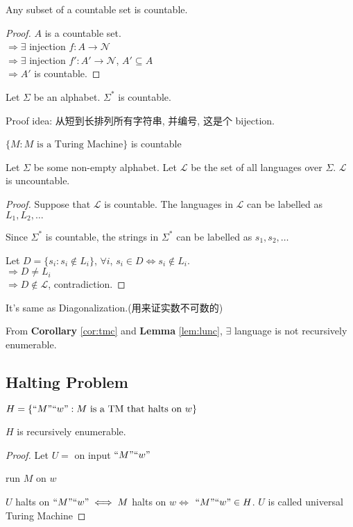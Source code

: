 \begin{corollary}
    Any subset of a countable set is countable. 
\end{corollary}
\begin{proof}
    $A$ is a countable set. \\
    $\Rightarrow \exists$ injection $f:A\to \mathcal{N}$\\
    $\Rightarrow \exists$ injection $f':A' \to \mathcal{N}$, $A'\subseteq A$\\
    $\Rightarrow A'$ is countable. 
\end{proof}

\begin{lemma}
    Let $\Sigma$ be an alphabet. $\Sigma^*$ is countable. 
\end{lemma}
Proof idea: 从短到长排列所有字符串, 并编号, 这是个 bijection. 

\begin{corollary}\label{cor:tmc}
    $\{ M: M \text{ is a Turing Machine} \}$ is countable
\end{corollary}

\begin{lemma}\label{lem:lunc}
    Let $\Sigma$ be some non-empty alphabet. Let $\mathcal{L}$ be the set of all languages over $\Sigma$. $\mathcal{L}$ is uncountable. 
\end{lemma}
\begin{proof}
    Suppose that $\mathcal{L}$ is countable. The languages in $\mathcal{L}$ can be labelled as $L_1,L_2,\dots$ 
    
    Since $\Sigma^*$ is countable, the strings in $\Sigma^*$ can be labelled as $s_1,s_2,\dots$

    Let $D=\{ s_i:s_i\notin L_i \}$, $\forall i$, $s_i\in D \iff s_i\notin L_i$. \\
    $\Rightarrow D\ne L_i$\\
    $\Rightarrow D\notin \mathcal{L}$, contradiction. 
\end{proof}
It's same as Diagonalization.(用来证实数不可数的)

From \textbf{Corollary} \ref{cor:tmc} and \textbf{Lemma} \ref{lem:lunc}, $\exists$ language is not recursively enumerable. 

\subsection{Halting Problem}
$H=\{ ``M"``w": M \text{ is a TM that halts on }w \}$

\begin{theorem}
    $H$ is recursively enumerable. 
\end{theorem}
\begin{proof}
    Let $U=$ on input $``M"``w"$
    \begin{algorithm}[H]
        \caption{$U$}
        \begin{algorithmic}
            \State run $M$ on $w$
        \end{algorithmic}
    \end{algorithm}
    $U$ halts on $``M"``w"\iff M$ halts on $w \iff$ $``M"``w"\in H$. $U$ is called universal Turing Machine
\end{proof}

